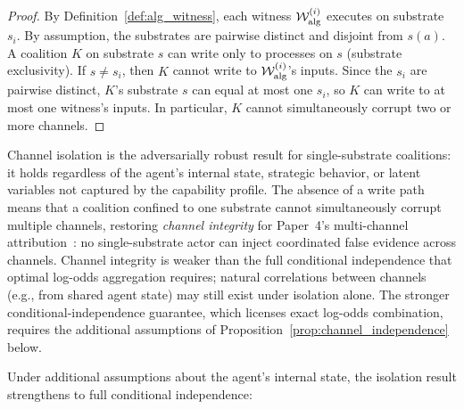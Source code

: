 \begin{proof}
By Definition~\ref{def:alg_witness}, each witness
$\mathcal{W}^{(i)}_{\mathrm{alg}}$ executes on substrate $s_i$.  By
assumption, the substrates are pairwise distinct and disjoint
from $s(a)$.  A coalition $K$ on substrate $s$ can write only to
processes on $s$ (substrate exclusivity).  If $s \neq s_i$, then $K$
cannot write to $\mathcal{W}^{(i)}_{\mathrm{alg}}$'s inputs.  Since
the $s_i$ are pairwise distinct, $K$'s substrate $s$ can equal at
most one $s_i$, so $K$ can write to at most one witness's inputs.
In particular, $K$ cannot simultaneously corrupt two or more
channels.
\end{proof}

Channel isolation is the adversarially robust result for
single-substrate coalitions: it holds regardless of the agent's
internal state, strategic behavior, or latent variables not captured
by the capability profile.  The absence of a write path means that
a coalition confined to one substrate cannot simultaneously corrupt
multiple channels, restoring \emph{channel integrity} for Paper~4's
multi-channel attribution~\citep{lasser2026scm}: no single-substrate
actor can inject coordinated false evidence across channels.
Channel integrity is weaker than the full conditional independence
that optimal log-odds aggregation requires; natural correlations
between channels (e.g., from shared agent state) may still exist
under isolation alone.  The stronger conditional-independence
guarantee, which licenses exact log-odds combination, requires the
additional assumptions of
Proposition~\ref{prop:channel_independence} below.

Under additional assumptions about the agent's internal state, the
isolation result strengthens to full conditional independence:


